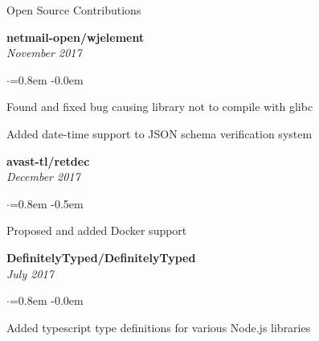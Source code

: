 \documentclass{resume}
\begin{document}
  \begin{rSection}{Open Source Contributions}
  	\vspace{-0.5em}
  	\begin{center}
	  	\begin{minipage}[t]{0.33333\textwidth}
			\raggedright
			{\bf netmail-open/wjelement}\\
			{\em November 2017} \\
			\begin{list}{$\cdot$}{\leftmargin=0.8em}
				\itemsep -0.0em \vspace{-0.2em}
				\item {\small Found and fixed bug causing library not to compile with glibc}
				\item {\small Added date-time support to JSON schema verification system}
			\end{list}
		\end{minipage}%
  		\begin{minipage}[t]{0.33333\textwidth}
  			\raggedright
  			{\bf avast-tl/retdec} \\
  			{\em December 2017}\\
  			\begin{list}{$\cdot$}{\leftmargin=0.8em}
  				\itemsep -0.5em \vspace{-0.2em}
  				\item {\small Proposed and added Docker support}
  			\end{list}
  		\end{minipage}%
	  	\begin{minipage}[t]{0.33333\textwidth}
	  		\raggedright
	  		{\bf DefinitelyTyped/DefinitelyTyped}\\
  			{\em July 2017} \\
  			\begin{list}{$\cdot$}{\leftmargin=0.8em}
  				\itemsep -0.0em \vspace{-0.2em}
  				\item {\small Added typescript type definitions for various Node.js libraries}
  			\end{list}
	  	\end{minipage}
	  \end{center}
  \end{rSection}
\end{document}
